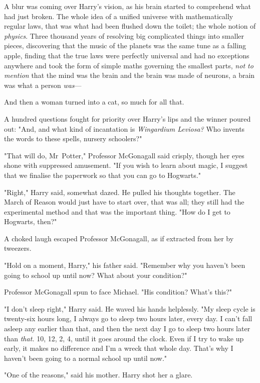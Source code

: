 A blur was coming over Harry's vision, as his brain started to comprehend what
had just broken. The whole idea of a unified universe with mathematically
regular laws, that was what had been flushed down the toilet; the whole notion
of \emph{physics}. Three thousand years of resolving big complicated things
into smaller pieces, discovering that the music of the planets was the same
tune as a falling apple, finding that the true laws were perfectly universal
and had no exceptions anywhere and took the form of simple maths governing the
smallest parts, \emph{not to mention} that the mind was the brain and the brain
was made of neurons, a brain was what a person \emph{was}---

And then a woman turned into a cat, so much for all that.

A hundred questions fought for priority over Harry's lips and the winner poured
out: "And, and what kind of incantation is \emph{Wingardium Leviosa?} Who
invents the words to these spells, nursery schoolers?"

"That will do, Mr~Potter," Professor McGonagall said crisply, though her eyes
shone with suppressed amusement. "If you wish to learn about magic, I suggest
that we finalise the paperwork so that you can go to Hogwarts."

"Right," Harry said, somewhat dazed. He pulled his thoughts together. The March
of Reason would just have to start over, that was all; they still had the
experimental method and that was the important thing. "How do I get to
Hogwarts, then?"

A choked laugh escaped Professor McGonagall, as if extracted from her by
tweezers.

"Hold on a moment, Harry," his father said. "Remember why you haven't been
going to school up until now? What about your condition?"

Professor McGonagall spun to face Michael. "His condition? What's this?"

"I don't sleep right," Harry said. He waved his hands helplessly. "My sleep
cycle is twenty-six hours long, I always go to sleep two hours later, every
day. I can't fall asleep any earlier than that, and then the next day I go to
sleep two hours later than \emph{that.} 10\PM, 12\AM, 2\AM, 4\AM, until it goes
around the clock. Even if I try to wake up early, it makes no difference and
I'm a wreck that whole day. That's why I haven't been going to a normal school
up until now."

"One of the reasons," said his mother. Harry shot her a glare.

